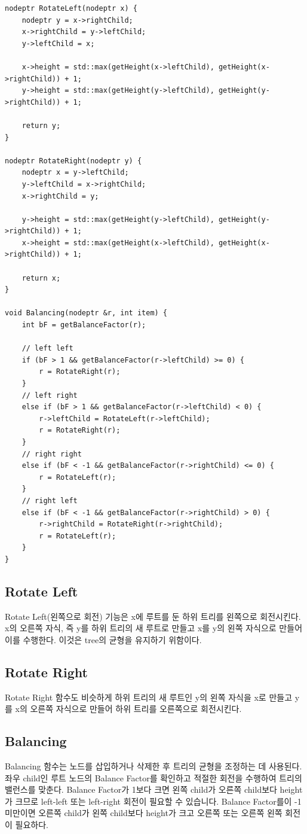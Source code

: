 \documentclass{article}
\begin{document}
\begin{verbatim}
nodeptr RotateLeft(nodeptr x) {
    nodeptr y = x->rightChild;
    x->rightChild = y->leftChild;
    y->leftChild = x;

    x->height = std::max(getHeight(x->leftChild), getHeight(x->rightChild)) + 1;
    y->height = std::max(getHeight(y->leftChild), getHeight(y->rightChild)) + 1;

    return y;
}

nodeptr RotateRight(nodeptr y) {
    nodeptr x = y->leftChild;
    y->leftChild = x->rightChild;
    x->rightChild = y;

    y->height = std::max(getHeight(y->leftChild), getHeight(y->rightChild)) + 1;
    x->height = std::max(getHeight(x->leftChild), getHeight(x->rightChild)) + 1;

    return x;
}

void Balancing(nodeptr &r, int item) {
    int bF = getBalanceFactor(r);

    // left left
    if (bF > 1 && getBalanceFactor(r->leftChild) >= 0) {
        r = RotateRight(r);
    }
    // left right
    else if (bF > 1 && getBalanceFactor(r->leftChild) < 0) {
        r->leftChild = RotateLeft(r->leftChild);
        r = RotateRight(r);
    }
    // right right
    else if (bF < -1 && getBalanceFactor(r->rightChild) <= 0) {
        r = RotateLeft(r);
    }
    // right left
    else if (bF < -1 && getBalanceFactor(r->rightChild) > 0) {
        r->rightChild = RotateRight(r->rightChild);
        r = RotateLeft(r);
    }
}
\end{verbatim}

\subsection{Rotate Left}
Rotate Left(왼쪽으로 회전) 기능은 x에 루트를 둔 하위 트리를 왼쪽으로 회전시킨다. x의 오른쪽 자식, 즉 y를 하위 트리의 새 루트로 만들고 x를 y의 왼쪽 자식으로 만들어 이를 수행한다. 이것은 tree의 균형을 유지하기 위함이다.

\subsection{Rotate Right}
Rotate Right 함수도 비슷하게 하위 트리의 새 루트인 y의 왼쪽 자식을 x로 만들고 y를 x의 오른쪽 자식으로 만들어 하위 트리를 오른쪽으로 회전시킨다.

\subsection{Balancing}
Balancing 함수는 노드를 삽입하거나 삭제한 후 트리의 균형을 조정하는 데 사용된다. 좌우 child인 루트 노드의 Balance Factor를 확인하고 적절한 회전을 수행하여 트리의 밸런스를 맞춘다. Balance Factor가 1보다 크면 왼쪽 child가 오른쪽 child보다 height가 크므로 left-left 또는 left-right 회전이 필요할 수 있습니다. Balance Factor를이 -1 미만이면 오른쪽 child가 왼쪽 child보다  height가 크고 오른쪽 또는 오른쪽 왼쪽 회전이 필요하다.
\end{document}
